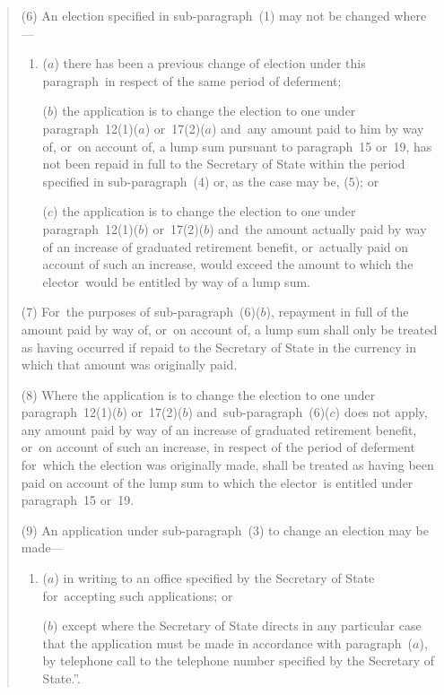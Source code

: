 \documentclass[12pt,a4paper]{article}
\begin{document}
\begin{enumerate}
\begin{quotation}
(6) An election specified in sub-paragraph~(1) may not be changed where—
\begin{enumerate}\item[]
($a$) there has been a previous change of election under this paragraph~in respect of the same period of deferment;

($b$) the application is to change the election to one under paragraph~12(1)($a$)  or~17(2)($a$)  and~any amount paid to him by way of, or~on account of, a lump sum pursuant to paragraph~15 or~19, has not been repaid in full to the Secretary of State within the period specified in sub-paragraph~(4) or, as the case may be, (5); or

($c$) the application is to change the election to one under paragraph~12(1)($b$)  or~17(2)($b$)  and~the amount actually paid by way of an increase of graduated retirement benefit, or~actually paid on account of such an increase, would exceed the amount to which the elector~would be entitled by way of a lump sum.
\end{enumerate}

(7) For~the purposes of sub-paragraph~(6)($b$), repayment in full of the amount paid by way of, or~on account of, a lump sum shall only be treated as having occurred if repaid to the Secretary of State in the currency in which that amount was originally paid.

(8) Where the application is to change the election to one under paragraph~12(1)($b$)  or~17(2)($b$)  and~sub-paragraph~(6)($c$)  does not apply, any amount paid by way of an increase of graduated retirement benefit, or~on account of such an increase, in respect of the period of deferment for~which the election was originally made, shall be treated as having been paid on account of the lump sum to which the elector~is entitled under paragraph~15 or~19.

(9) An application under sub-paragraph~(3) to change an election may be made—
\begin{enumerate}\item[]
($a$) in writing to an office specified by the Secretary of State for~accepting such applications; or

($b$) except where the Secretary of State directs in any particular case that the application must be made in accordance with paragraph~($a$), by telephone call to the telephone number specified by the Secretary of State.”.
\end{enumerate}
\end{quotation}
\end{enumerate}
\end{document}
